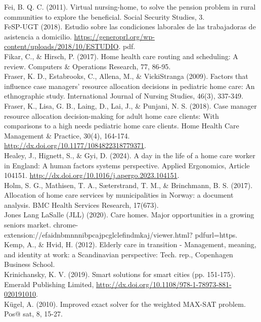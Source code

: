 \documentclass[10pt]{article}
\begin{document}
Fei, B. Q. C. (2011). Virtual nursing-home, to solve the pension problem in rural communities to explore the beneficial. Social Security Studies, 3.\\
FeSP-UGT (2018). Estudio sobre las condiciones laborales de las trabajadoras de asistencia a domicilio. \href{https://generoprl.org/wp-content/uploads/2018/10/ESTUDIO}{https://generoprl.org/wp-content/uploads/2018/10/ESTUDIO}. pdf.\\
Fikar, C., \& Hirsch, P. (2017). Home health care routing and scheduling: A review. Computers \& Operations Research, 77, 86-95.\\
Fraser, K. D., Estabrooks, C., Allena, M., \& VickiStranga (2009). Factors that influence case managers' resource allocation decisions in pediatric home care: An ethnographic study. International Journal of Nursing Studies, 46(3), 337-349.\\
Fraser, K., Lisa, G. B., Laing, D., Lai, J., \& Punjani, N. S. (2018). Case manager resource allocation decision-making for adult home care clients: With comparisons to a high needs pediatric home care clients. Home Health Care Management \& Practice, 30(4), 164-174. \href{http://dx.doi.org/10.1177/1084822318779371}{http://dx.doi.org/10.1177/1084822318779371}.\\
Healey, J., Hignett, S., \& Gyi, D. (2024). A day in the life of a home care worker in England: A human factors systems perspective. Applied Ergonomics, Article 104151. \href{http://dx.doi.org/10.1016/j.apergo.2023.104151}{http://dx.doi.org/10.1016/j.apergo.2023.104151}.\\
Holm, S. G., Mathisen, T. A., Sæterstrand, T. M., \& Brinchmann, B. S. (2017). Allocation of home care services by municipalities in Norway: a document analysis. BMC Health Services Research, 17(673).\\
Jones Lang LaSalle (JLL) (2020). Care homes. Major opportunities in a growing seniors market. chrome-extension://efaidnbmnnnibpcajpcglclefindmkaj/viewer.html? pdfurl=https.\\
Kemp, A., \& Hvid, H. (2012). Elderly care in transition - Management, meaning, and identity at work: a Scandinavian perspective: Tech. rep., Copenhagen Business School.\\
Krinichansky, K. V. (2019). Smart solutions for smart cities (pp. 151-175). Emerald Publishing Limited, \href{http://dx.doi.org/10.1108/978-1-78973-881-020191010}{http://dx.doi.org/10.1108/978-1-78973-881-020191010}.\\
Kügel, A. (2010). Improved exact solver for the weighted MAX-SAT problem. Pos@ sat, 8, 15-27.\\
\end{document}
